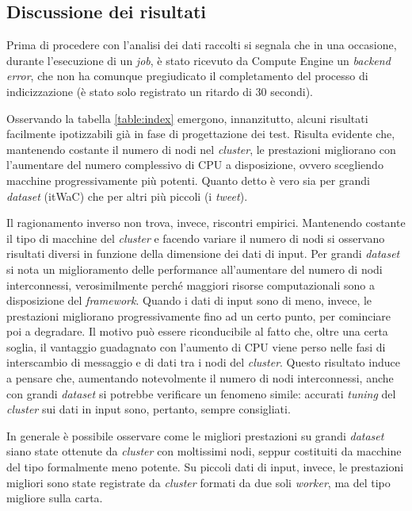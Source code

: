 \subsection{Discussione dei risultati}

Prima di procedere con l'analisi dei dati raccolti si segnala che in una occasione, durante l'esecuzione di un \textit{job}, è stato ricevuto da Compute Engine un \textit{backend error}, 
che non ha comunque pregiudicato il completamento del processo di indicizzazione (è stato solo registrato un ritardo di 30 secondi).

Osservando la tabella \ref{table:index} emergono, innanzitutto, alcuni risultati facilmente ipotizzabili già in fase di progettazione dei test. 
Risulta evidente che, mantenendo costante il numero di nodi nel \textit{cluster}, le prestazioni migliorano con l'aumentare del numero complessivo di CPU a disposizione, 
ovvero scegliendo macchine progressivamente più potenti. 
Quanto detto è vero sia per grandi \textit{dataset} (itWaC) che per altri più piccoli (i \textit{tweet}).

Il ragionamento inverso non trova, invece, riscontri empirici. Mantenendo costante il tipo di macchine del \textit{cluster} e facendo variare il numero di nodi si osservano risultati diversi 
in funzione della dimensione dei dati di input. Per grandi \textit{dataset} si nota un miglioramento delle performance all'aumentare del numero di nodi interconnessi, verosimilmente perché 
maggiori risorse computazionali sono a disposizione del \textit{framework}.
Quando i dati di input sono di meno, invece, le prestazioni migliorano progressivamente fino ad un certo punto, per cominciare poi a degradare.
Il motivo può essere riconducibile al fatto che, oltre una certa soglia, il vantaggio guadagnato con l'aumento di CPU viene perso nelle fasi di interscambio di messaggio e di dati tra i nodi del \textit{cluster}.
Questo risultato induce a pensare che, aumentando notevolmente il numero di nodi interconnessi, anche con grandi \textit{dataset} si potrebbe verificare un fenomeno simile: 
accurati \textit{tuning} del \textit{cluster} sui dati in input sono, pertanto, sempre consigliati.

In generale è possibile osservare come le migliori prestazioni su grandi \textit{dataset} siano state ottenute da \textit{cluster} con moltissimi nodi, seppur costituiti da macchine del tipo 
formalmente meno potente. Su piccoli dati di input, invece, le prestazioni migliori sono state registrate da \textit{cluster} formati da due soli \textit{worker}, ma del tipo migliore sulla carta.

